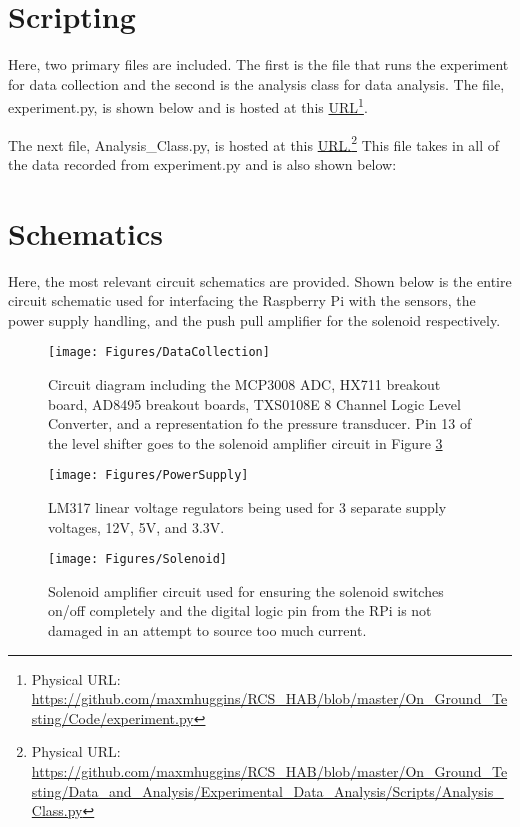 \section{Scripting}\label{sec:Scripting}
Here, two primary files are included. The first is the file that runs the experiment for data collection and the second is the analysis class for data analysis. The file, experiment.py, is shown below and is hosted at this \href{https://github.com/maxmhuggins/RCS_HAB/blob/master/On_Ground_Testing/Code/experiment.py}{URL}\footnote{Physical URL: \url{https://github.com/maxmhuggins/RCS_HAB/blob/master/On_Ground_Testing/Code/experiment.py}}.

The next file, Analysis\_Class.py, is hosted at this \href{https://github.com/maxmhuggins/RCS_HAB/blob/master/On_Ground_Testing/Data_and_Analysis/Experimental_Data_Analysis/Scripts/Analysis_Class.py}{URL.}\footnote{Physical URL: \url{https://github.com/maxmhuggins/RCS_HAB/blob/master/On_Ground_Testing/Data_and_Analysis/Experimental_Data_Analysis/Scripts/Analysis_Class.py}} This file takes in all of the data recorded from experiment.py and is also shown below:

\section{Schematics}\label{sec:Schematics}
Here, the most relevant circuit schematics are provided. Shown below is the entire circuit schematic used for interfacing the Raspberry Pi with the sensors, the power supply handling, and the push pull amplifier for the solenoid respectively.
\begin{figure}[!ht]
\centering
\texttt{[image: Figures/DataCollection]}
\caption{Circuit diagram including the MCP3008 ADC, HX711 breakout board, AD8495 breakout boards, TXS0108E 8 Channel Logic Level Converter, and a representation fo the pressure transducer. Pin 13 of the level shifter goes to the solenoid amplifier circuit in Figure \ref{fig:SolenoidSchem}}
\label{fig:DataCollectionSchem}
\end{figure}\clearpage
\begin{figure}[h!]
\centering
\texttt{[image: Figures/PowerSupply]}
\caption{LM317 linear voltage regulators being used for 3 separate supply voltages, 12V, 5V, and 3.3V.}
\label{fig:PowerSupplySchem}
\end{figure}
\begin{figure}[!ht]
\centering
\texttt{[image: Figures/Solenoid]}
\caption{Solenoid amplifier circuit used for ensuring the solenoid switches on/off completely and the digital logic pin from the RPi is not damaged in an attempt to source too much current.}
\label{fig:SolenoidSchem}
\end{figure}
